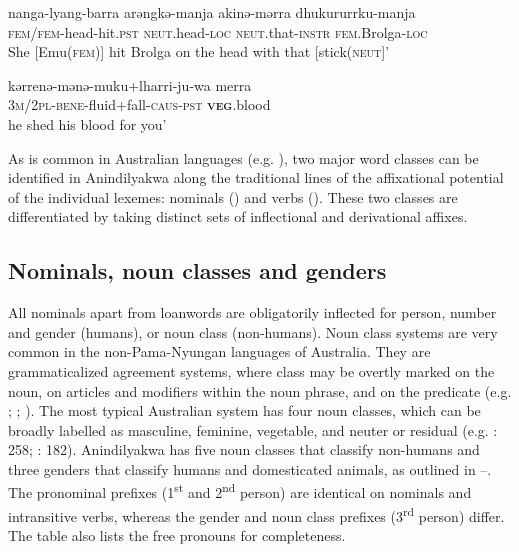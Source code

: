 \documentclass[output=paper]{langscibook}
\begin{document}
\ex
\label{ex:vanegmond:2b}
\gll nanga-lyang-barra arəngkə-manja akinə-mərra dhukururrku-manja\\
\textsc{fem/fem}-head-hit.\textsc{pst} \textsc{neut}.head-\textsc{loc} \textsc{neut}.that-\textsc{instr} \textsc{fem}.Brolga-\textsc{loc}\\
\glt She [Emu(\textsc{fem})] hit Brolga on the head with that [stick(\textsc{neut}]’ \citep[310]{Leeding1989}


\ex
\label{ex:vanegmond:2c}
\gll kərrenə-mənə-muku+lharri-ju-wa merra\\
\textsc{3m/2pl}-\textsc{bene}-fluid+fall-\textsc{caus}-\textsc{pst} \textbf{\textsc{veg}}.blood\\
\glt he shed his blood for you’
\z
\z



As is common in Australian languages (e.g. \citealt{Dixon1980}), two major word classes can be identified in Anindilyakwa along the traditional lines of the affixational potential of the individual lexemes: nominals () and verbs (). These two classes are differentiated by taking distinct sets of inflectional and derivational affixes.



\subsection{Nominals, noun classes and genders}\label{sec:vanegmond:2.2}

All nominals apart from loanwords are obligatorily inflected for person, number and gender (humans), or noun class (non-humans). Noun class systems are very common in the non-Pama-Nyungan languages of Australia. They are grammaticalized agreement systems, where class may be overtly marked on the noun, on articles and modifiers within the noun phrase, and on the predicate (e.g. \citealt{Dixon1986}; \citealt{Sands1995}; \citealt{Aikhenvald2000}). The most typical Australian system has four noun classes, which can be broadly labelled as masculine, feminine, vegetable, and neuter or residual (e.g. \citealt{Sands1995}: 258; \citealt{Evans2003}: 182). Anindilyakwa has five noun classes that classify non-humans and three genders that classify humans and domesticated animals, as outlined in --. The pronominal prefixes (1\textsuperscript{st} and 2\textsuperscript{nd} person) are identical on nominals and intransitive verbs, whereas the gender and noun class prefixes (3\textsuperscript{rd} person) differ. The table also lists the free pronouns for completeness.
\end{document}

